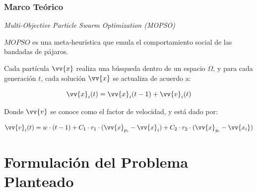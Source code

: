 \documentclass[usenames,dvipsnames]{beamer}
\begin{document}
\begin{frame}
\frametitle{Marco Teórico} 
\begin{exampleblock}{\textit{Multi-Objective Particle Swarm Optimization (MOPSO)}}

$MOPSO$ es una meta-heurística que emula el comportamiento social de las bandadas de pájaros.

Cada partícula $\vv{x}$ realiza una búsqueda dentro de un espacio $\Omega$, y para cada generación $t$, cada solución $\vv{x}$ se actualiza de acuerdo a:

\begin{equation}\label{eq:posicion1}
\vv{x}_i(t) = \vv{x}_i(t-1) + \vv{v}_i(t)
\end{equation}

Donde $\vv{v}$ se conoce como el factor de velocidad, y está dado por:

\begin{equation}\label{eq:velocidad1}
\vv{v}_i(t) = w \cdot (t-1) + C_1 \cdot r_1 \cdot (\vv{x}_{p_i} - \vv{x}_i) + C_2 \cdot r_2 \cdot (\vv{x}_{g_i} - \vv{x_i})
\end{equation}

\end{exampleblock}


\end{frame}

\section{Formulación del Problema Planteado}
\end{document}
